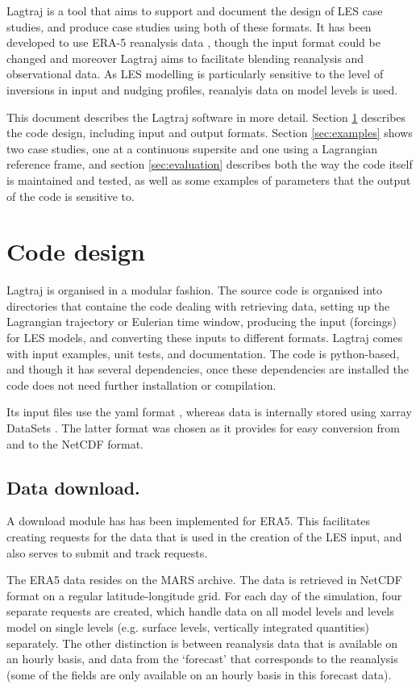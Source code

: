 \documentclass[a4paper,11pt]{article}
\begin{document}
Lagtraj is a tool that aims to support and document the design of LES
case studies, and produce case studies using both of these formats. It
has been developed to use ERA-5 reanalysis data \citep{hersbach2020},
though the input format could be changed and moreover Lagtraj aims to
facilitate blending reanalysis and observational data. As LES modelling
is particularly sensitive to the level of inversions in input and
nudging profiles, reanalyis data on model levels is used.

This document describes the Lagtraj software in more detail. Section \ref{sec:design}
describes the code design, including input and output formats. Section
\ref{sec:examples} shows two case studies, one at a continuous supersite
and one using a Lagrangian reference frame, and section
\ref{sec:evaluation} describes both the way the code itself is
maintained and tested, as well as some examples of parameters that the
output of the code is sensitive to.

\section{Code design}\label{sec:design}

Lagtraj is organised in a modular fashion. The source code is organised
into directories that containe the code dealing with retrieving data,
setting up the Lagrangian trajectory or Eulerian time window, producing
the input (forcings) for LES models, and converting these inputs to
different formats. Lagtraj comes with input examples, unit tests, and
documentation. The code is python-based, and though it has several
dependencies, once these dependencies are installed the code does not
need further installation or compilation.

Its input files use the yaml format \citep{ben2009}, whereas data is
internally stored using xarray DataSets \citep{hoyer2017}. The latter
format was chosen as it provides for easy conversion from and to the
NetCDF format.

\subsection{Data download.}

A download module has has been implemented for ERA5. This facilitates
creating requests for the data that is used in the creation of the LES
input, and also serves to submit and track requests.

The ERA5 data resides on the MARS archive. The data is retrieved in
NetCDF format on a regular latitude-longitude grid. For each day of the
simulation, four separate requests are created, which handle data on
all model levels and levels model on single levels (e.g. surface
levels, vertically integrated quantities) separately. The other
distinction is between reanalysis data that is available on an hourly
basis, and data from the `forecast' that corresponds to the reanalysis
(some of the fields are only available on an hourly basis in this
forecast data).
\end{document}
